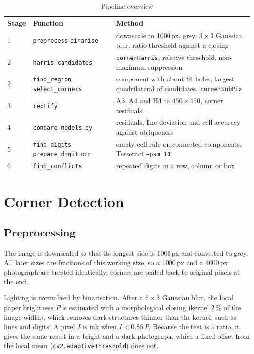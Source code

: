 \documentclass[conference]{IEEEtran}
\begin{document}
\begin{table}[t]
\caption{Pipeline overview}
\label{tab:pipeline}
\centering
\footnotesize
\begin{tabular}{@{}l>{\raggedright\arraybackslash}p{}>{\raggedright\arraybackslash}p{}@{}}
\toprule
Stage & Function & Method\\
\midrule
1 & \texttt{preprocess} \texttt{binarise} & downscale to 1000\,px, grey, $3\times3$ Gaussian blur, ratio threshold against a closing\\
2 & \texttt{harris\_candidates} & \texttt{cornerHarris}, relative threshold, non-maximum suppression\\
2 & \texttt{find\_region} \texttt{select\_corners} & component with about 81 holes, largest quadrilateral of candidates, \texttt{cornerSubPix}\\
3 & \texttt{rectify} & A3, A4 and H4 to $450\times450$, corner residuals\\
4 & \texttt{compare\_models.py} & residuals, line deviation and cell accuracy against obliqueness\\
5 & \texttt{find\_digits} \texttt{prepare\_digit} \texttt{ocr} & empty-cell rule on connected components, Tesseract \texttt{--psm 10}\\
6 & \texttt{find\_conflicts} & repeated digits in a row, column or box\\
\bottomrule
\end{tabular}
\end{table}

\section{Corner Detection}
\subsection{Preprocessing}
The image is downscaled so that its longest side is 1000\,px and converted
to grey. All later sizes are fractions of this working size, so a 1000\,px
and a 4000\,px photograph are treated identically; corners are scaled back
to original pixels at the end.

Lighting is normalised by binarisation. After a $3\times3$ Gaussian blur,
the local paper brightness $P$ is estimated with a morphological closing
(kernel 2\,\% of the image width), which removes dark structures thinner
than the kernel, such as lines and digits. A pixel $I$ is ink when
$I < 0.85\,P$. Because the test is a ratio, it gives the same result in a
bright and a dark photograph, which a fixed offset from the local mean
(\texttt{cv2.adaptiveThreshold}) does not.
\end{document}
